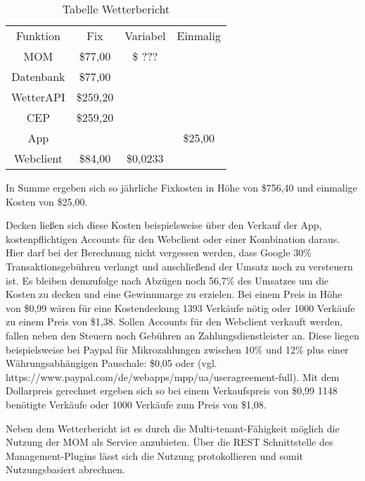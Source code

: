 \begin{table}
\caption{Tabelle Wetterbericht}
\centering
\begin{tabular}{cccc}
	Funktion 	& Fix		& Variabel	& Einmalig \\
	MOM 		& \$77,00	& \$ ??? 	& \\
	Datenbank	& \$77,00	&			& \\
	WetterAPI 	& \$259,20	&	 		& \\
	CEP 		& \$259,20	& 			& \\
	App			&			&			& \$25,00 \\
	Webclient	& \$84,00	& \$0,0233	& \\
\end{tabular}
\end{table}

In Summe ergeben sich so jährliche Fixkosten in Höhe von \$756,40 und einmalige Kosten von \$25,00.

Decken ließen sich diese Kosten beispielsweise über den Verkauf der App, kostenpflichtigen Accounts für den Webclient oder einer Kombination daraus. Hier darf bei der Berechnung nicht vergessen werden, dass Google 30\% Transaktionsgebühren verlangt und anschließend der Umsatz noch zu versteuern ist. Es bleiben demzufolge nach Abzügen noch 56,7\% des Umsatzes um die Kosten zu decken und eine Gewinnmarge zu erzielen. Bei einem Preis in Höhe von \$0,99 wären für eine Kostendeckung 1393 Verkäufe nötig oder 1000 Verkäufe zu einem Preis von \$1,38. Sollen Accounts für den Webclient verkauft werden, fallen neben den Steuern noch Gebühren an Zahlungsdienstleister an. Diese liegen beispielsweise bei Paypal für Mikrozahlungen zwischen 10\% und 12\% plus einer Währungsabhängigen Pauschale: \$0,05 oder  (vgl. https://www.paypal.com/de/webapps/mpp/ua/useragreement-full). Mit dem Dollarpreis gerechnet ergeben sich so bei einem Verkaufspreis von \$0,99 1148 benötigte Verkäufe oder 1000 Verkäufe zum Preis von \$1,08.

Neben dem Wetterbericht ist es durch die Multi-tenant-Fähigkeit möglich die Nutzung der MOM als Service anzubieten. Über die REST Schnittstelle des Management-Plugins lässt sich die Nutzung protokollieren und somit Nutzungsbasiert abrechnen.
